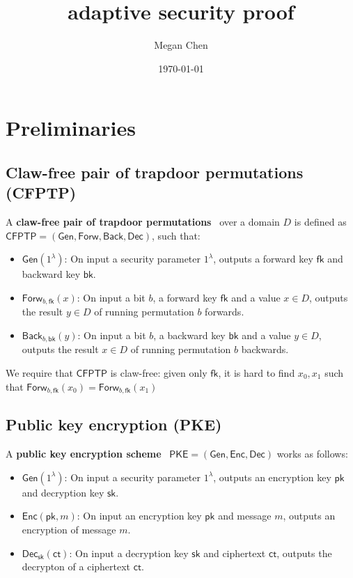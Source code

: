 \documentclass[11pt,letterpaper]{article}
\title{\cite{CanettiF01} adaptive security proof}
\author{Megan Chen}
\date{\today}
\renewcommand{\emph}[1]{\textbf{#1}~}
\newcommand{\doclearpage}{%
  \iffull\clearpage\else\fi
}
\theoremstyle{plain} %
\theoremstyle{definition} %
\theoremstyle{remark} %
\newcommand{\Input}{x}
\newcommand{\SecParam}{\lambda}
\newcommand{\PKE}{\mathsf{PKE}}
\newcommand{\Gen}{\mathsf{Gen}}
\newcommand{\Enc}{\mathsf{Enc}}
\newcommand{\Dec}{\mathsf{Dec}}
\newcommand{\EncKey}{\mathsf{pk}}
\newcommand{\DecKey}{\mathsf{sk}}
\newcommand{\Msg}{m}
\newcommand{\Ct}{\mathsf{ct}}
\newcommand{\CFPTP}{\mathsf{CFPTP}}
\newcommand{\Forw}{\mathsf{Forw}}
\newcommand{\Back}{\mathsf{Back}}
\newcommand{\ForwKey}{\mathsf{fk}}
\newcommand{\BackKey}{\mathsf{bk}}
\newcommand{\Domain}{D}
\newcommand{\CFPTPInput}{\Input}
\newcommand{\CFPTPOutput}{y}
\newcommand{\CFPTPBit}{b}
\begin{document}
\maketitle
\tableofcontents

\doclearpage
\section{Preliminaries}
\label{sec:preliminaries}

\subsection{Claw-free pair of trapdoor permutations (CFPTP)}
A \emph{claw-free pair of trapdoor permutations} over a domain $\Domain$ is defined as $\CFPTP = (\Gen, \Forw, \Back, \Dec)$, such that:
\begin{itemize}
	\item $\Gen(1^\SecParam)$: On input a security parameter $1^\SecParam$, outputs a forward key $\ForwKey$ and backward key $\BackKey$.
	\item $\Forw_{\CFPTPBit, \ForwKey}(\CFPTPInput)$: On input a bit $\CFPTPBit$, a forward key $\ForwKey$ and a value $\Input \in \Domain$, outputs the result $\CFPTPOutput \in \Domain$ of running permutation $\CFPTPBit$ forwards.
	\item $\Back_{\CFPTPBit, \BackKey}(\CFPTPOutput)$: On input a bit $\CFPTPBit$, a backward key $\BackKey$ and a value $\CFPTPOutput \in \Domain$, outputs the result $\Input \in \Domain$ of running permutation $b$ backwards.
\end{itemize}
We require that $\CFPTP$ is claw-free: given only $\ForwKey$, it is hard to find $\CFPTPInput_0, \CFPTPInput_1$ such that $\Forw_{\CFPTPBit, \ForwKey}(\CFPTPInput_0) = \Forw_{\CFPTPBit, \ForwKey}(\CFPTPInput_1)$

\subsection{Public key encryption (PKE)}

A \emph{public key encryption scheme} $\PKE = (\Gen, \Enc, \Dec)$ works as follows:
\begin{itemize}
	\item $\Gen(1^\SecParam)$: On input a security parameter $1^\SecParam$, outputs an encryption key $\EncKey$ and decryption key $\DecKey$.
	\item $\Enc(\EncKey,\Msg)$: On input an encryption key $\EncKey$ and message $\Msg$, outputs an encryption of message $\Msg$.
	\item $\Dec_{\DecKey}(\Ct)$: On input a decryption key $\DecKey$ and ciphertext $\Ct$, outputs the decrypton of a ciphertext $\Ct$.
\end{itemize}
\end{document}
